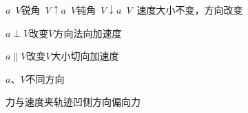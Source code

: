 $a$\ $V$锐角\ $V\uparrow$\qquad $a$\ $V$钝角\ $V\downarrow$\qquad $a$\ $V$\ 速度大小不变，方向改变 %

$a\perp V$\quad 改变$V$方向\quad 法向加速度

$a\parallel V$\quad 改变$V$大小\quad 切向加速度

$a$、$V$不同方向

力与速度夹轨迹\quad 凹侧方向偏向力
